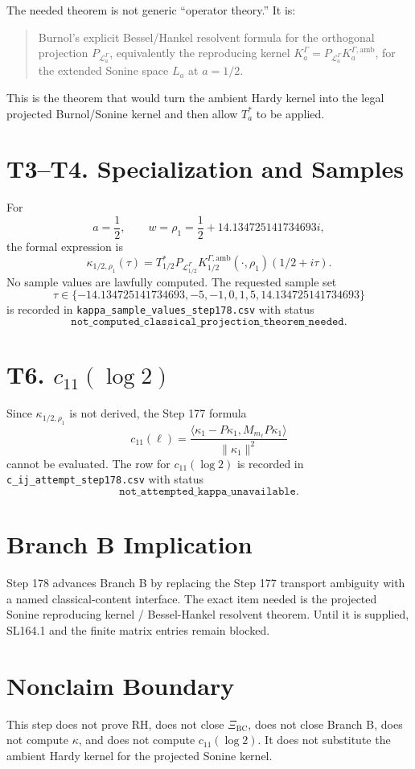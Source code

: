 \documentclass[11pt]{article}
\begin{document}
The needed theorem is not generic ``operator theory.'' It is:

\begin{quote}
Burnol's explicit Bessel/Hankel resolvent formula for the orthogonal
projection \(P_{\mathcal L_a^\Gamma}\), equivalently the reproducing kernel
\(K_a^\Gamma=P_{\mathcal L_a^\Gamma}K_a^{\Gamma,\mathrm{amb}}\), for the
extended Sonine space \(L_a\) at \(a=1/2\).
\end{quote}

This is the theorem that would turn the ambient Hardy kernel into the legal
projected Burnol/Sonine kernel and then allow \(T_a^*\) to be applied.

\section{T3--T4. Specialization and Samples}

For
\[
a=\frac12,\qquad w=\rho_1=\frac12+14.134725141734693i,
\]
the formal expression is
\[
\kappa_{1/2,\rho_1}(\tau)
=
T_{1/2}^*
P_{\mathcal L_{1/2}^\Gamma}
K_{1/2}^{\Gamma,\mathrm{amb}}(\cdot,\rho_1)(1/2+i\tau).
\]
No sample values are lawfully computed.  The requested sample set
\[
\tau\in\{-14.134725141734693,-5,-1,0,1,5,14.134725141734693\}
\]
is recorded in \texttt{kappa\_sample\_values\_step178.csv} with status
\[
\texttt{not\_computed\_classical\_projection\_theorem\_needed}.
\]

\section{T6. \(c_{11}(\log2)\)}

Since \(\kappa_{1/2,\rho_1}\) is not derived, the Step 177 formula
\[
c_{11}(\ell)
=
\frac{\langle \kappa_1-P\kappa_1,
M_{m_\ell}P\kappa_1\rangle}{\|\kappa_1\|^2}
\]
cannot be evaluated.  The row for \(c_{11}(\log2)\) is recorded in
\texttt{c\_ij\_attempt\_step178.csv} with status
\[
\texttt{not\_attempted\_kappa\_unavailable}.
\]

\section{Branch B Implication}

Step 178 advances Branch B by replacing the Step 177 transport ambiguity with
a named classical-content interface.  The exact item needed is the projected
Sonine reproducing kernel / Bessel-Hankel resolvent theorem.  Until it is
supplied, SL164.1 and the finite matrix entries remain blocked.

\section{Nonclaim Boundary}

This step does not prove RH, does not close \(\Xi_{\mathrm{BC}}\), does not
close Branch B, does not compute \(\kappa\), and does not compute
\(c_{11}(\log2)\).  It does not substitute the ambient Hardy kernel for the
projected Sonine kernel.
\end{document}
